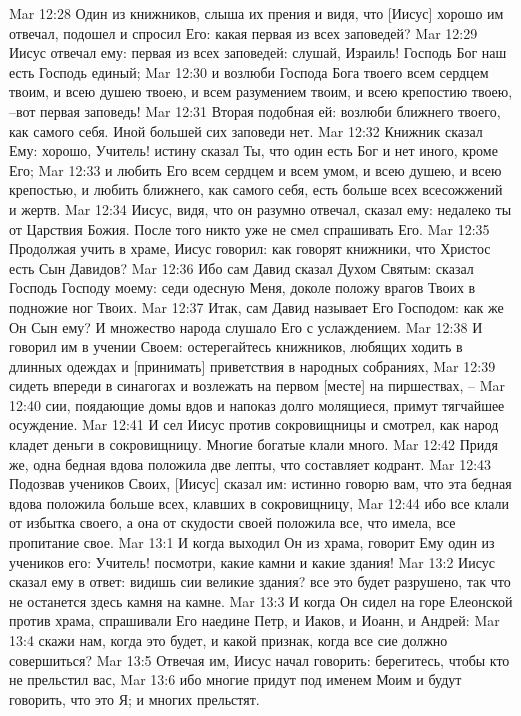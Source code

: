 Mar 12:28  Один из книжников, слыша их прения и видя, что [Иисус] хорошо им отвечал, подошел и спросил Его: какая первая из всех заповедей?
Mar 12:29  Иисус отвечал ему: первая из всех заповедей: слушай, Израиль! Господь Бог наш есть Господь единый;
Mar 12:30  и возлюби Господа Бога твоего всем сердцем твоим, и всею душею твоею, и всем разумением твоим, и всею крепостию твоею, --вот первая заповедь!
Mar 12:31  Вторая подобная ей: возлюби ближнего твоего, как самого себя. Иной большей сих заповеди нет.
Mar 12:32  Книжник сказал Ему: хорошо, Учитель! истину сказал Ты, что один есть Бог и нет иного, кроме Его;
Mar 12:33  и любить Его всем сердцем и всем умом, и всею душею, и всею крепостью, и любить ближнего, как самого себя, есть больше всех всесожжений и жертв.
Mar 12:34  Иисус, видя, что он разумно отвечал, сказал ему: недалеко ты от Царствия Божия. После того никто уже не смел спрашивать Его.
Mar 12:35  Продолжая учить в храме, Иисус говорил: как говорят книжники, что Христос есть Сын Давидов?
Mar 12:36  Ибо сам Давид сказал Духом Святым: сказал Господь Господу моему: седи одесную Меня, доколе положу врагов Твоих в подножие ног Твоих.
Mar 12:37  Итак, сам Давид называет Его Господом: как же Он Сын ему? И множество народа слушало Его с услаждением.
Mar 12:38  И говорил им в учении Своем: остерегайтесь книжников, любящих ходить в длинных одеждах и [принимать] приветствия в народных собраниях,
Mar 12:39  сидеть впереди в синагогах и возлежать на первом [месте] на пиршествах, --
Mar 12:40  сии, поядающие домы вдов и напоказ долго молящиеся, примут тягчайшее осуждение.
Mar 12:41  И сел Иисус против сокровищницы и смотрел, как народ кладет деньги в сокровищницу. Многие богатые клали много.
Mar 12:42  Придя же, одна бедная вдова положила две лепты, что составляет кодрант.
Mar 12:43  Подозвав учеников Своих, [Иисус] сказал им: истинно говорю вам, что эта бедная вдова положила больше всех, клавших в сокровищницу,
Mar 12:44  ибо все клали от избытка своего, а она от скудости своей положила все, что имела, все пропитание свое.
Mar 13:1  И когда выходил Он из храма, говорит Ему один из учеников его: Учитель! посмотри, какие камни и какие здания!
Mar 13:2  Иисус сказал ему в ответ: видишь сии великие здания? все это будет разрушено, так что не останется здесь камня на камне.
Mar 13:3  И когда Он сидел на горе Елеонской против храма, спрашивали Его наедине Петр, и Иаков, и Иоанн, и Андрей:
Mar 13:4  скажи нам, когда это будет, и какой признак, когда все сие должно совершиться?
Mar 13:5  Отвечая им, Иисус начал говорить: берегитесь, чтобы кто не прельстил вас,
Mar 13:6  ибо многие придут под именем Моим и будут говорить, что это Я; и многих прельстят.

